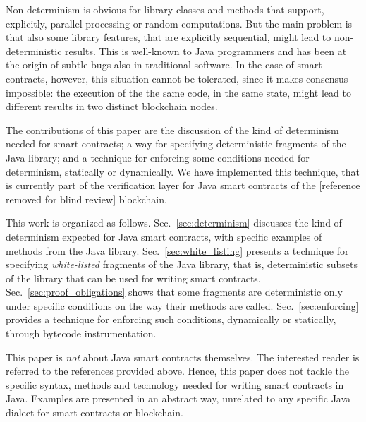 Non-determinism is obvious for library classes and methods that support, explicitly,
parallel processing or random computations. But the main problem is that
also some library features, that are explicitly sequential, might lead to
non-deterministic results.
This is well-known to Java programmers and has been at the origin of subtle
bugs also in traditional software. In the case of smart contracts, however,
this situation cannot be tolerated, since it makes consensus impossible:
the execution of the the same code, in the same state,
might lead to different results in two distinct blockchain nodes.

The contributions of this paper are the discussion of the kind of determinism
needed for smart contracts; a way for specifying deterministic fragments
of the Java library; and a technique for
enforcing some conditions needed for determinism, statically or dynamically.
We have implemented this technique, that is currently part of the verification
layer for Java smart contracts of the [reference removed for blind review] blockchain.

This work is organized as follows.
Sec.~\ref{sec:determinism} discusses the kind of determinism expected for Java smart contracts,
with specific examples of methods from the Java library.
Sec.~\ref{sec:white_listing} presents a technique for specifying \emph{white-listed}
fragments of the Java library,
that is, deterministic subsets of the library that can be used for writing smart contracts.
Sec.~\ref{sec:proof_obligations} shows that
some fragments are deterministic only under specific conditions on the way their methods
are called.
Sec.~\ref{sec:enforcing} provides a technique for enforcing such conditions, dynamically
or statically, through bytecode instrumentation.

This paper is \emph{not} about Java smart contracts themselves. The interested reader
is referred to the references provided above. Hence, this paper does not tackle
the specific syntax, methods and technology needed for writing smart contracts in Java.
Examples are presented in an abstract way, unrelated to any specific
Java dialect for smart contracts or blockchain.
